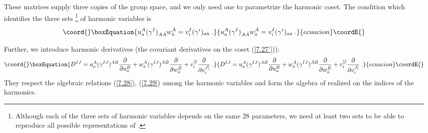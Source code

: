 \documentclass[a4paper,12pt]{article}
\begin{document}
These matrices supply three copies of the group space, and we only 
need one to parametrize the harmonic coset. The condition which 
identifies the three sets \footnote{Although each of the three 
sets of harmonic variables depends on the same 28 parameters, we 
need at least two sets to be able to reproduce all possible 
representations of \coordHE{}.} of harmonic variables is 
\begin{equation}\coord{}\boxEquation{\label{7.29}
  u_a^A (\gamma^I)_{A\dot A} w^{\dot A}_{\dot a} = v^I_i (\gamma^i)_{a\dot 
a}\;. 
}{u_a^A (\gamma^I)_{A\dot A} w^{\dot A}_{\dot a} = v^I_i (\gamma^i)_{a\dot 
a}\;. 
}{ecuacion}\coordE{}\end{equation}

Further, we introduce harmonic derivatives (the covariant 
derivatives on the coset (\ref{7.27'})): 
\begin{equation}\coord{}\boxEquation{\label{7.30}
  D^{IJ} = u^A_a (\gamma^{IJ})^{AB}{\partial\over\partial u^B_a} + 
w^{\dot A}_{\dot a} (\gamma^{IJ})^{\dot A\dot 
B}{\partial\over\partial w^{\dot B}_{\dot a}} + v^{[I}_i 
{\partial\over\partial v^{J]}_{i}}\;. 
}{D^{IJ} = u^A_a (\gamma^{IJ})^{AB}{\partial\over\partial u^B_a} + 
w^{\dot A}_{\dot a} (\gamma^{IJ})^{\dot A\dot 
B}{\partial\over\partial w^{\dot B}_{\dot a}} + v^{[I}_i 
{\partial\over\partial v^{J]}_{i}}\;. 
}{ecuacion}\coordE{}\end{equation}
They respect the algebraic relations  (\ref{7.28}), (\ref{7.29}) 
among the harmonic variables and form the algebra of 
\coordHE{} realized on the indices \coordHE{} of the 
harmonics. 
\end{document}
